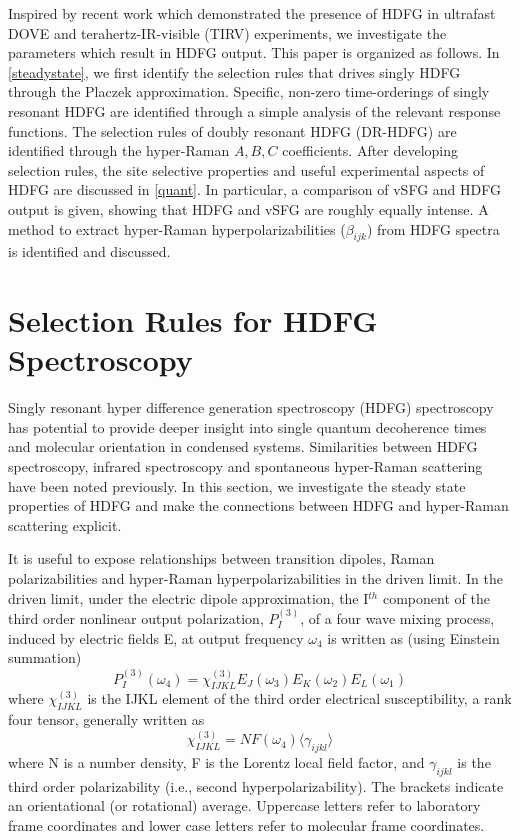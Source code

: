 \documentclass[aip, jcp, reprint, onecolumn]{revtex4-2}
\begin{document}
Inspired by recent work which demonstrated the presence of HDFG in ultrafast DOVE and terahertz-IR-visible (TIRV) experiments, we investigate the parameters which result in HDFG output. \cite{Cho2000, Bonn2024, McDonnell2024}
This paper is organized as follows.
In \autoref{steadystate}, we first identify the selection rules that drives singly HDFG through the Placzek approximation.
Specific, non-zero time-orderings of singly resonant HDFG are identified through a simple analysis of the relevant response functions.
The selection rules of doubly resonant HDFG (DR-HDFG) are identified through the hyper-Raman $A,B,C$ coefficients.
After developing selection rules, the site selective properties and useful experimental aspects of HDFG are discussed in \autoref{quant}.
In particular, a comparison of vSFG and HDFG output is given, showing that HDFG and vSFG are roughly equally intense.
A method to extract hyper-Raman hyperpolarizabilities ($\beta_{ijk}$) from HDFG spectra is identified and discussed.

\section{Selection Rules for HDFG Spectroscopy}\label{steadystate}

Singly resonant hyper difference generation spectroscopy (HDFG) spectroscopy has potential to provide deeper insight into single quantum decoherence times and molecular orientation in condensed systems.
Similarities between HDFG spectroscopy, infrared spectroscopy and spontaneous hyper-Raman scattering have been noted previously. \cite{RN352, Bonn2024, McDonnell2024}
In this section, we investigate the steady state properties of HDFG and make the connections between HDFG and hyper-Raman scattering explicit.

It is useful to expose relationships between transition dipoles, Raman polarizabilities and hyper-Raman hyperpolarizabilities in the driven limit. \cite{Simpson2004}
In the driven limit, under the electric dipole approximation, the I$^{th}$ component of the third order nonlinear output polarization, ${P}^{(3)}_I$, of a four wave mixing process, induced by electric fields E, at output frequency $\omega_4$ is written as (using Einstein summation) \cite{RN307}
\begin{equation} \label{polarization}
{P}^{(3)}_I (\omega_4)  = \chi^{(3)}_{IJKL} E_J(\omega_3) E_K(\omega_2) E_L(\omega_1) 
\end{equation}
where $\chi^{(3)}_{IJKL}$ is the IJKL element of the third order electrical susceptibility, a rank four tensor, generally written as
\begin{equation}
	\chi^{(3)}_{IJKL} = NF(\omega_4) \langle \gamma_{ijkl} \rangle
\end{equation}
where N is a number density, F is the Lorentz local field factor, and $\gamma_{ijkl}$ is the third order polarizability (i.e., second hyperpolarizability). 
The brackets indicate an orientational (or rotational) average.\cite{Andrews1977}
Uppercase letters refer to laboratory frame coordinates and lower case letters refer to molecular frame coordinates.
\end{document}
